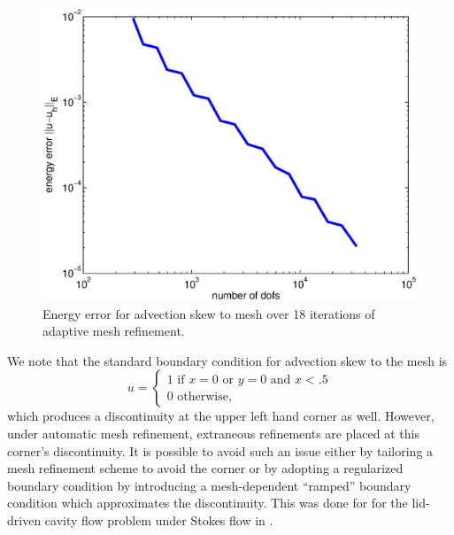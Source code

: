 \begin{figure}[!h]
\centering
\includegraphics[scale=.45]{figs/rates/eps5e7SkewToMesh.eps}
\caption{Energy error for advection skew to mesh over 18 iterations of adaptive mesh refinement.}
\end{figure}

We note that the standard boundary condition for advection skew to the mesh is 
\[
u = \begin{cases}
1 \text{ if } x = 0 \text{ or } y = 0 \text{ and } x< .5\\
0 \text{ otherwise},
\end{cases}
\]
which produces a discontinuity at the upper left hand corner as well.  However, under automatic mesh refinement, extraneous refinements are placed at this corner's discontinuity.  It is possible to avoid such an issue either by tailoring a mesh refinement scheme to avoid the corner or by adopting a regularized boundary condition by introducing a mesh-dependent ``ramped'' boundary condition which approximates the discontinuity.  This was done for for the lid-driven cavity flow problem under Stokes flow in \cite{stokesDPG}.  

